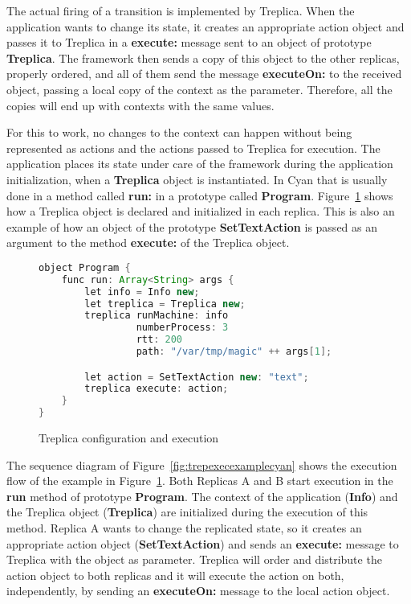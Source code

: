 \documentclass[preprint,review]{elsarticle}
\newcommand{\srcstyle}[1]{\ttfamily\textbf{#1}\rmfamily}
\begin{document}
The actual firing of a transition is implemented by Treplica. When the
application  wants to  change  its state,  it  creates an  appropriate
action  object and  passes  it to  Treplica  in a  \srcstyle{execute:}
message  sent  to  an  object of  prototype  \srcstyle{Treplica}.   The
framework then  sends a  copy of  this object  to the  other replicas,
properly    ordered,   and    all   of    them   send    the   message
\srcstyle{executeOn:} to the received object,  passing a local copy of
the context as  the parameter.  Therefore, all the copies  will end up
with contexts with the same values.

For this to  work, no changes to the context  can happen without being
represented  as  actions  and  the  actions  passed  to  Treplica  for
execution.   The  application  places  its state  under  care  of  the
framework    during   the    application   initialization,    when   a
\srcstyle{Treplica} object  is instantiated.  In Cyan  that is usually
done  in  a  method  called  \srcstyle{run:}  in  a  prototype  called
\srcstyle{Program}.    Figure~\ref{fig:TreplicaMain}   shows   how   a
Treplica object is  declared and initialized in each  replica. This is
also   an    example   of   how    an   object   of    the   prototype
\srcstyle{SetTextAction}  is  passed  as  an argument  to  the  method
\srcstyle{execute:} of the Treplica object.

\begin{figure}[h]
\centering
\begin{lstlisting}[language=Java]
object Program {
    func run: Array<String> args {
        let info = Info new;
        let treplica = Treplica new;
        treplica runMachine: info
                 numberProcess: 3
                 rtt: 200
                 path: "/var/tmp/magic" ++ args[1];

        let action = SetTextAction new: "text";
        treplica execute: action;
    }
}
\end{lstlisting}
\caption{Treplica configuration and execution}
\label{fig:TreplicaMain}
\end{figure}

The sequence diagram of Figure~\ref{fig:trepexecexamplecyan} shows the
execution flow of the  example in Figure~\ref{fig:TreplicaMain}.  Both
Replicas  A and  B start  execution  in the  \srcstyle{run} method  of
prototype   \srcstyle{Program}.   The   context  of   the  application
(\srcstyle{Info})  and the  Treplica object  (\srcstyle{Treplica}) are
initialized during the  execution of this method.  Replica  A wants to
change  the replicated  state,  so it  creates  an appropriate  action
object  (\srcstyle{SetTextAction})  and sends  an  \srcstyle{execute:}
message to Treplica with the  object as parameter. Treplica will order
and distribute the action object to  both replicas and it will execute
the action on both, independently, by sending an
\srcstyle{executeOn:} message to the local action object.
\end{document}
